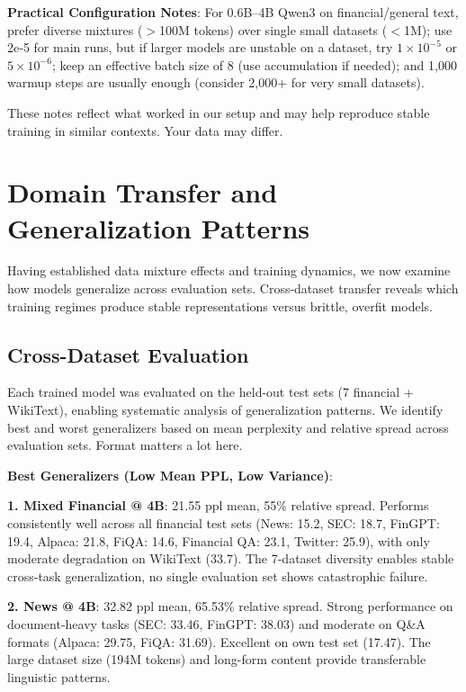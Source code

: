 \textbf{Practical Configuration Notes}: For 0.6B–4B Qwen3 on financial/general text, prefer diverse mixtures ($>$100M tokens) over single small datasets ($<$1M); use 2e‑5 for main runs, but if larger models are unstable on a dataset, try $1\times10^{-5}$ or $5\times10^{-6}$; keep an effective batch size of 8 (use accumulation if needed); and 1,000 warmup steps are usually enough (consider 2,000+ for very small datasets).

These notes reflect what worked in our setup and may help reproduce stable training in similar contexts. Your data may differ.

\section{Domain Transfer and Generalization Patterns}

Having established data mixture effects and training dynamics, we now examine how models generalize across evaluation sets. Cross-dataset transfer reveals which training regimes produce stable representations versus brittle, overfit models.

\subsection{Cross-Dataset Evaluation}

Each trained model was evaluated on the held-out test sets (7 financial + WikiText), enabling systematic analysis of generalization patterns. We identify best and worst generalizers based on mean perplexity and relative spread across evaluation sets. Format matters a lot here.

\textbf{Best Generalizers (Low Mean PPL, Low Variance)}:

\textbf{1. Mixed Financial @ 4B}: 21.55 ppl mean, 55\% relative spread. Performs consistently well across all financial test sets (News: 15.2, SEC: 18.7, FinGPT: 19.4, Alpaca: 21.8, FiQA: 14.6, Financial QA: 23.1, Twitter: 25.9), with only moderate degradation on WikiText (33.7). The 7-dataset diversity enables stable cross-task generalization, no single evaluation set shows catastrophic failure.

\textbf{2. News @ 4B}: 32.82 ppl mean, 65.53\% relative spread. Strong performance on document-heavy tasks (SEC: 33.46, FinGPT: 38.03) and moderate on Q\&A formats (Alpaca: 29.75, FiQA: 31.69). Excellent on own test set (17.47). The large dataset size (194M tokens) and long-form content provide transferable linguistic patterns.

